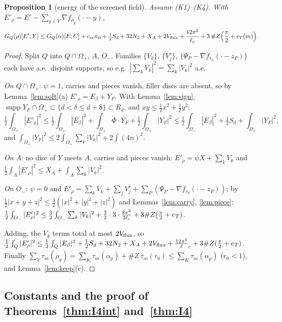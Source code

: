 \documentclass[11pt]{article}
\newtheorem{proposition}[theorem]{Proposition}
\theoremstyle{definition}
\theoremstyle{remark}
\newcommand{\dep}{\delta}
\newcommand{\lc}{\ell_{\rm c}}
\DeclareMathOperator{\supp}{supp}
\begin{document}
\begin{proposition}[energy of the screened field]\label{prop:energy}
Assume (K1)--(K4). With $E'_\rho=E'-\sum_{y\in Y}\nabla f_{\rho_y}(\cdot-y)$,
\[
G_Q(\rho)[E';Y]\le G_Q(\alpha)[E;C]+c_mn_\partial+\tfrac12S_d+32N_2+X_A+2V_{\rm flux}+\frac{12\pi^2}{\lc}+3\,\#Z\Bigl(\frac\pi2+e_T(m)\Bigr).
\]
\end{proposition}
\begin{proof}
Split $Q$ into $Q\cap\Omega_+$, $A$, $O_-$. Families $\{V_k\}$, $\{V^c_j\}$, $\{\Psi_P-\nabla f_{r_0}(\cdot-z_P)\}$ each have a.e.\ disjoint supports, so e.g.\
$|\sum_kV_k|^2=\sum_k|V_k|^2$ a.e.

\emph{On $Q\cap\Omega_+$}: $\psi=1$, carries and pieces vanish, filler discs are absent, so by Lemma~\ref{lem:soft}(a) $E'_\rho=E_\beta+Y_F$. With Lemma~\ref{lem:sign},
$\supp Y_F\cap\Omega_+\subset\{d<\dep\le d+8\}\subset R_d$, and $xy\le\frac12x^2+\frac12y^2$:
\[
\tfrac12\int_{\Omega_+}|E'_\rho|^2\le\tfrac12\int_{\Omega_+}|E_\beta|^2+\int_{\Omega_+}\Phi\cdot Y_F+\tfrac12\int_{\Omega_+}|Y_F|^2\le\tfrac12\int_{\Omega_+}|E_\beta|^2+\tfrac12S_d+\int_{\Omega_+}|Y_F|^2,
\]
and $\int_{\Omega_+}|Y_F|^2\le2\int_{\Omega_+}\sum_k|V_k|^2+2\int(4n)^2$.

\emph{On $A$}: no disc of $Y$ meets $A$, carries and pieces vanish: $E'_\rho=\psi X+\sum_kV_k$ and $\frac12\int_A|E'_\rho|^2\le X_A+\int_A\sum_k|V_k|^2$.

\emph{On $O_-$}: $\psi=0$ and $E'_\rho=\sum_kV_k+\sum_jV^c_j+\sum_P(\Psi_P-\nabla f_{r_0}(\cdot-z_P))$; by $\frac12|x+y+z|^2\le\frac32(|x|^2+|y|^2+|z|^2)$ and
Lemmas~\ref{lem:carry}, \ref{lem:piece}: $\frac12\int_{O_-}|E'_\rho|^2\le\frac32\int_{O_-}\sum_k|V_k|^2+\frac32\cdot3\cdot\frac{8\pi^2}{3\lc}+3\#Z(\frac\pi2+e_T)$.

Adding, the $V_k$ terms total at most $2V_{\rm flux}$, so
$\frac12\int_Q|E'_\rho|^2\le\frac12\int_Q|E_\beta|^2+\frac12S_d+32N_2+X_A+2V_{\rm flux}+\frac{12\pi^2}\lc+3\#Z(\frac\pi2+e_T)$.
Finally $\sum_Y\tau_m(\rho_y)=\sum_K\tau_m(\alpha_p)+\#Z\,\tau_m(r_0)\le\sum_K\tau_m(\alpha_p)$ ($r_0<1$), and Lemma~\ref{lem:keep}(c).
\end{proof}

\subsection{\texorpdfstring{Constants and the proof of Theorems~\ref{thm:I4int} and~\ref{thm:I4}}{Constants and the proofs of the screening theorems}}
\end{document}
